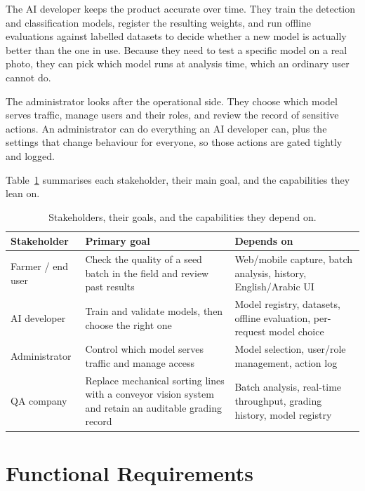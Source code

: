 The AI developer keeps the product accurate over time. They train the detection
and classification models, register the resulting weights, and run offline
evaluations against labelled datasets to decide whether a new model is actually
better than the one in use. Because they need to test a specific model on a real
photo, they can pick which model runs at analysis time, which an ordinary user
cannot do.

The administrator looks after the operational side. They choose which model
serves traffic, manage users and their roles, and review the record of sensitive
actions. An administrator can do everything an AI developer can, plus the
settings that change behaviour for everyone, so those actions are gated tightly
and logged.



Table~\ref{tab:ch3-stakeholders} summarises each stakeholder, their main goal,
and the capabilities they lean on.

\begin{singlespace}
\begin{table}[htbp]
\centering
\caption{Stakeholders, their goals, and the capabilities they depend on.}
\label{tab:ch3-stakeholders}
\begin{tabular}{@{}p{2.6cm}p{5.4cm}p{4.6cm}@{}}
\toprule
\textbf{Stakeholder} & \textbf{Primary goal} & \textbf{Depends on} \\
\midrule
Farmer / end user & Check the quality of a seed batch in the field and review past results & Web/mobile capture, batch analysis, history, English/Arabic UI \\
AI developer & Train and validate models, then choose the right one & Model registry, datasets, offline evaluation, per-request model choice \\
Administrator & Control which model serves traffic and manage access & Model selection, user/role management, action log \\
QA company & Replace mechanical sorting lines with a conveyor vision system and retain an auditable grading record & Batch analysis, real-time throughput, grading history, model registry \\
\bottomrule
\end{tabular}
\end{table}
\end{singlespace}

\section{Functional Requirements}

